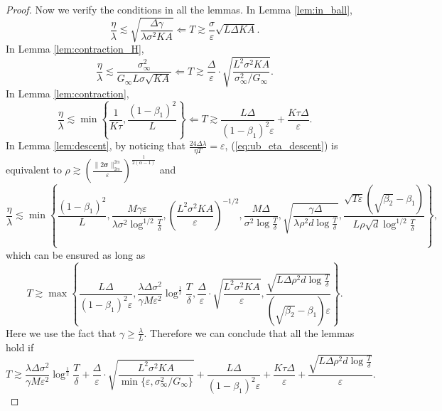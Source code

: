 \documentclass{article} %
\numberwithin{equation}{section}
\renewcommand{\eqref}[1]{(\ref{#1})}
\begin{document}
\begin{proof}
    Now we verify the conditions in all the lemmas.
    In Lemma \ref{lem:in_ball},
    \begin{equation}
        \frac{\eta}{\lambda}\lesssim \sqrt{\frac{\Delta\gamma}{\lambda \sigma^2KA}}
        \Longleftarrow T\gtrsim \frac{\sigma}{\varepsilon} \sqrt{L\Delta KA}.
    \end{equation}
    In Lemma \ref{lem:contraction_H},
    \begin{equation}
        \frac{\eta}{\lambda}\lesssim \frac{\sigma_{\infty}^2}{G_\infty L\sigma\sqrt{KA}} 
        \Longleftarrow T\gtrsim \frac{\Delta}{\varepsilon}\cdot \sqrt{\frac{L^2\sigma^2KA}{\sigma_\infty^2/G_\infty}}.
    \end{equation}
    In Lemma \ref{lem:contraction},
    \begin{equation}
        \frac{\eta}{\lambda} \lesssim \min\left\{\frac{1}{K\tau}, \frac{(1-\beta_1)^2}{L}\right\}
        \Longleftarrow T\gtrsim \frac{L\Delta}{(1-\beta_1)^2\varepsilon}+\frac{K\tau\Delta}{\varepsilon}.
    \end{equation}
    In Lemma \ref{lem:descent}, by noticing that $\frac{24\Delta\lambda}{\eta T}=\varepsilon$, \eqref{eq:ub_eta_descent} is equivalent to $\rho\gtrsim \left(\frac{\|2\boldsymbol{\sigma}\|_{2\alpha}^{2\alpha}}{\varepsilon}\right)^{\frac{1}{2(\alpha-1)}}$ and
    \begin{equation}
        \frac{\eta}{\lambda} \lesssim \min\left\{\frac{(1-\beta_1)^{2}}{L}, \frac{M\gamma\varepsilon}{\lambda\sigma^2\log^{1/2}\frac{T}{\delta}}, 
        \left(\frac{L^2\sigma^2KA}{\varepsilon}\right)^{-1/2},
        \frac{M\Delta}{\sigma^2\log\frac{T}{\delta}},
        \sqrt{\frac{\gamma\Delta}{\lambda\rho^2d\log\frac{T}{\delta}}},
        \frac{\sqrt{T\varepsilon}(\sqrt{\beta_2}-\beta_1)}{L\rho\sqrt{d}\log^{1/2}\frac{T}{\delta}}
        \right\},
    \end{equation}
    which can be ensured as long as
    \begin{equation}
        T\gtrsim \max\left\{\frac{L\Delta}{(1-\beta_1)^{2}\varepsilon}, \frac{\lambda\Delta\sigma^2}{\gamma M\varepsilon^2}\log^{\frac{1}{2}}\frac{T}{\delta}, \frac{\Delta}{\varepsilon}\cdot \sqrt{\frac{L^2\sigma^2KA}{\varepsilon}}, \frac{\sqrt{L\Delta\rho^2d\log\frac{T}{\delta}}}{(\sqrt{\beta_2}-\beta_1)\varepsilon}\right\}.
    \end{equation}
    Here we use the fact that $\gamma\geq \frac{\lambda}{L}$.
    Therefore we can conclude that all the lemmas hold if
    \begin{equation}
        T\gtrsim \frac{\lambda\Delta\sigma^2}{\gamma M\varepsilon^2}\log^{\frac{1}{2}}\frac{T}{\delta} + \frac{\Delta}{\varepsilon}\cdot \sqrt{\frac{L^2\sigma^2KA}{\min\{\varepsilon, \sigma_\infty^2/G_\infty\}}} + \frac{L\Delta}{(1-\beta_1)^{2}\varepsilon} + \frac{K\tau\Delta}{\varepsilon} + \frac{\sqrt{L\Delta\rho^2d\log\frac{T}{\delta}}}{\varepsilon}.
    \end{equation}


\end{proof}
\end{document}

